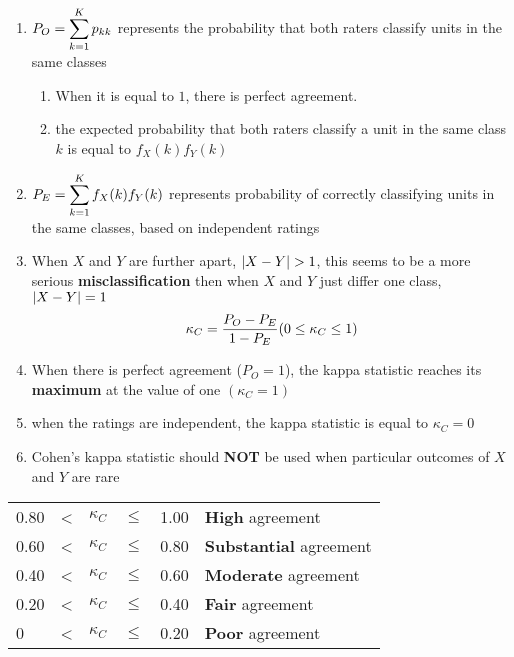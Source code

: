 \begin{enumerate}
    \item $P_O = \displaystyle\sum_{k=1}^K p_{kk}$ represents the probability that both raters classify units in the same classes
    \begin{enumerate}
        \item When it is equal to $1$, there is perfect agreement.

        \item the expected probability that both raters classify a unit in the same class $k$ is equal to $f_X(k)f_Y(k)$
    \end{enumerate}

    \item $P_E = \displaystyle\sum_{k=1}^K f_X(k)f_Y(k)$ represents probability of correctly classifying units in the same classes, based on independent ratings

    \item When $X$ and $Y$ are further apart, $\left| X - Y \right| > 1$, this seems to be a more serious \textbf{misclassification} then when $X$ and $Y$ just differ one class, $\left| X - Y \right| = 1$
    \[
        \hfill
        \kappa_C = \dfrac{P_O - P_E}{1 - P_E}
        \hfill
        (0 \leq \kappa_C \leq 1)
    \]

    \item When there is perfect agreement ($P_O = 1$), the kappa statistic reaches its \textbf{maximum} at the value of one $(\kappa_C = 1)$

    \item when the ratings are independent, the kappa statistic is equal to $\kappa_C = 0$

    \item Cohen’s kappa statistic should \textbf{NOT} be used when particular outcomes of $X$ and $Y$ are rare

\end{enumerate}

\begin{customTableWrapper}{1}
\begin{table}[H]
    \centering
    \begin{tabular}{l l l l l l}
    0.80 & < & $\kappa_C$ & $\leq$ & 1.00 &  \textbf{High} agreement\\
    0.60 & < & $\kappa_C$ & $\leq$ & 0.80  & \textbf{Substantial} agreement \\
    0.40 & < & $\kappa_C$ & $\leq$ & 0.60 &  \textbf{Moderate} agreement \\
    0.20 & < & $\kappa_C$ & $\leq$ & 0.40 &  \textbf{Fair} agreement \\
    0   & < & $\kappa_C$ & $\leq$ & 0.20 &  \textbf{Poor} agreement
    \end{tabular}
\end{table}
\end{customTableWrapper}


